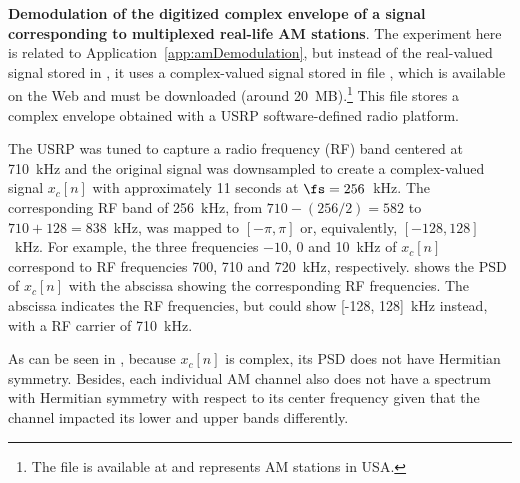 \bApplication \textbf{Demodulation of the digitized complex envelope of a signal corresponding to multiplexed real-life AM stations}.
\label{app:amDemodulationComplex}
The experiment here is related to Application~\ref{app:amDemodulation}, but instead of the
real-valued signal stored in , it uses a complex-valued signal 
stored in file , which is available on the Web and must be downloaded (around 20~MB).\footnote{The file is available at  and represents AM stations in USA.} This file stores a complex envelope obtained with a USRP software-defined radio platform.

The USRP was tuned to capture a radio frequency (RF) band centered at 710~kHz and the original signal was downsampled to create a complex-valued signal $x_c[n]$ with approximately 11 seconds at $\fs=256$~kHz. The corresponding RF band of 256~kHz, from $710-(256/2)=582$ to $710+128=838$~kHz, was mapped to
$[-\pi,\pi]$ or, equivalently, $[-128, 128]$~kHz. For example, the three frequencies $-10$, 0 and 10~kHz of $x_c[n]$ correspond to RF frequencies 700, 710 and 720~kHz, respectively.
 shows the PSD of $x_c[n]$ with the abscissa showing the corresponding
RF frequencies. The abscissa indicates the RF frequencies, but could show
[-128, 128]~kHz instead, with a RF carrier of 710~kHz.



As can be seen in , because $x_c[n]$ is complex, its PSD does not have Hermitian symmetry. Besides, each individual AM channel also does not have a spectrum with Hermitian symmetry with respect to its center frequency given that the channel impacted its lower and upper bands differently. 

